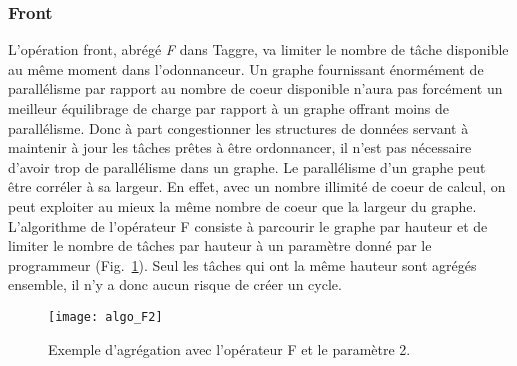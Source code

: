 \subsubsection{Front}
L'opération front, abrégé {\em F} dans Taggre, va limiter le nombre de tâche disponible au même moment dans l'odonnanceur.
%
Un graphe fournissant énormément de parallélisme par rapport au nombre de coeur disponible n'aura pas forcément un meilleur équilibrage de charge par rapport à un graphe offrant moins de parallélisme.
%
Donc à part congestionner les structures de données servant à maintenir à jour les tâches prêtes à être ordonnancer, il n'est pas nécessaire d'avoir trop de parallélisme dans un graphe.
%
Le parallélisme d'un graphe peut être corréler à sa largeur.
%
En effet, avec un nombre illimité de coeur de calcul, on peut exploiter au mieux la même nombre de coeur que la largeur du graphe.
%
L'algorithme de l'opérateur F consiste à parcourir le graphe par hauteur et de limiter le nombre de tâches par hauteur à un paramètre donné par le programmeur (Fig.~\ref{fig:algo_F2}).
%
Seul les tâches qui ont la même hauteur sont agrégés ensemble, il n'y a donc aucun risque de créer un cycle.
\begin{figure}[t!]
  \centering
  \texttt{[image: algo\_F2]}
  \caption{Exemple d'agrégation avec l'opérateur F et le paramètre 2.}
  \label{fig:algo_F2}
\end{figure}

